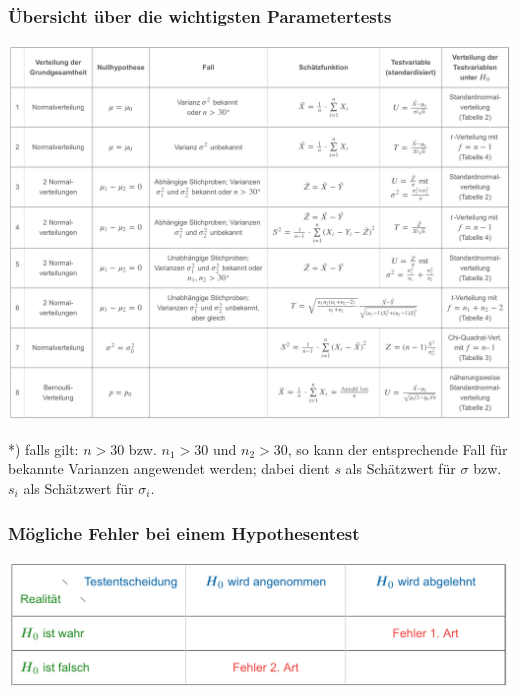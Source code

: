 \subsubsection{Übersicht über die wichtigsten Parametertests}
\label{sec:uebersicht_ueber_die_wichtigsten_parametertests}
\begin{center}
    \includegraphics[width=1\linewidth]{images/parametertests2}
\end{center}
*) falls gilt: $n > 30$ bzw. $n_1 > 30$ und $n_2 > 30$, so kann der entsprechende Fall für bekannte Varianzen angewendet werden; dabei dient $s$ als
Schätzwert für $\sigma$ bzw. $s_i$ als Schätzwert für $\sigma_i$.
\subsubsection{Mögliche Fehler bei einem Hypothesentest}
\label{sec:moegliche_fehler_bei_einem_hypothesentest}
\begin{center}
    \includegraphics[width=1\linewidth]{images/fehler}
\end{center}
